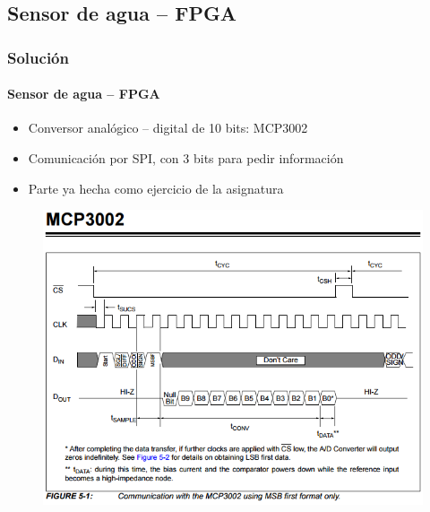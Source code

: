 \documentclass[compress]{beamer}
\begin{document}
	\subsection{Sensor de agua -- FPGA}
		\begin{frame}
			\frametitle{Soluci\'on}
			\framesubtitle{Sensor de agua -- FPGA}
				\begin{itemize}
					\item
					{

						Conversor anal\'ogico -- digital de 10 bits: MCP3002

					}
					\item
					{

						Comunicaci\'on por SPI, con 3 bits para pedir informaci\'on

					}
					\item
					{

						Parte ya hecha como ejercicio de la asignatura

					}
				\end{itemize}
				\begin{figure}
					\includegraphics[keepaspectratio = true, totalheight=0.6\textheight]{figuras/adc_spi.png}
				\end{figure}
 		\end{frame}
\end{document}
